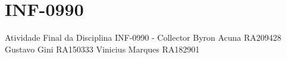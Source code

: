 \chapter{INF-\/0990}
\hypertarget{md__i_n_f-0990_2_r_e_a_d_m_e}{}\label{md__i_n_f-0990_2_r_e_a_d_m_e}
\label{md__i_n_f-0990_2_r_e_a_d_m_e_autotoc_md0}%
%
Atividade Final da Disciplina INF-\/0990 -\/  Collector Byron Acuna RA209428 Gustavo Gini RA150333 Vinicius Marques RA182901 